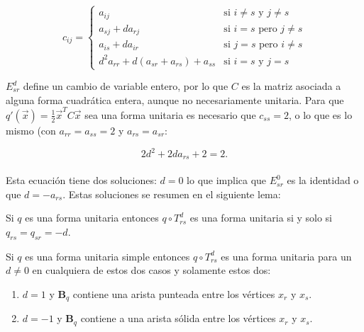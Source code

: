\begin{equation}
c_{ij} = \left \{ 
    \begin{matrix} 
    a_{ij} & \mbox{si } i \neq s \mbox{ y } j \neq s\\
    a_{sj} + da_{rj} & \mbox{si } i = s \mbox{ pero } j \neq s\\ 
    a_{is} + da_{ir} & \mbox{si } j = s \mbox{ pero } i \neq s\\
    d^{2}a_{rr} + d(a_{sr} + a_{rs}) + a_{ss} & \mbox{si } i = s \mbox{ y } j = s
    \end{matrix}\right.
    \label{ecuacion:2.1}
\end{equation}

$E_{sr}^{d}$ define un cambio de variable entero, por lo que $C$ es la matriz asociada a alguna forma cuadrática entera, aunque no necesariamente unitaria. Para que $q'(\overrightarrow{x}) = \frac{1}{2}\overrightarrow{x}^{T}C\overrightarrow{x}$ sea una forma unitaria es necesario que $c_{ss} = 2$, o lo que es lo mismo (con $a_{rr} = a_{ss} = 2$ y $a_{rs} = a_{sr}$:

\begin{equation*}
    2d^{2} + 2da_{rs} + 2 = 2.
\end{equation*}

\paragraph{}
Esta ecuación tiene dos soluciones: $d = 0$ lo que implica que $E_{sr}^{0}$ es la identidad o que $d = -a_{rs}$. Estas soluciones se resumen en el siguiente lema:

\begin{lemma}
Si $q$ es una forma unitaria entonces $q \circ T_{rs}^{d}$ es una forma unitaria si y solo si $q_{rs} = q_{sr} = -d$.
\label{lema:2.1}
\end{lemma}

\begin{corollary}
Si $q$ es una forma unitaria simple entonces $q \circ T_{rs}^{d}$ es una forma unitaria para un $d \neq 0$ en cualquiera de estos dos casos y solamente estos dos:
\label{corolario:2.2}
\end{corollary}

\begin{enumerate}
    \item $d = 1$ y $\textbf{B}_{q}$ contiene una arista punteada entre los vértices $x_{r}$ y $x_{s}$.
    \item $d = -1$ y $\textbf{B}_{q}$ contiene a una arista sólida entre los vértices $x_{r}$ y $x_{s}$.
\end{enumerate}

